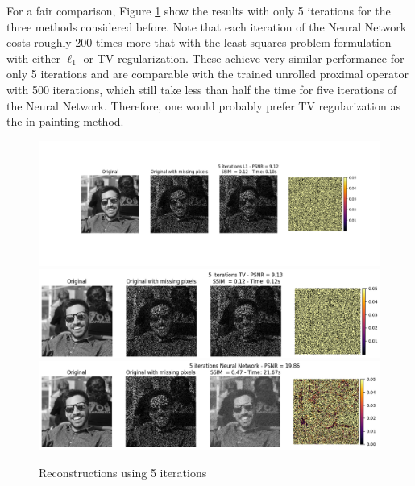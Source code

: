 \documentclass{article}
\begin{document}
\begin{enumerate}[label=2.\arabic*]
    For a fair comparison, Figure \ref{fig:5} show the results with only 5 iterations for the three methods considered before. Note that each iteration of the Neural Network costs roughly 200 times more that with the least squares problem formulation with either $\ell_1$ or TV regularization. These achieve very similar performance for only 5 iterations and are comparable with the trained unrolled proximal operator with 500 iterations, which still take less than half the time for five iterations of the Neural Network. Therefore, one would probably prefer TV regularization as the in-painting method.
    
    \begin{figure}[H]
        \centering
        \includegraphics[trim={4.5cm 3.5cm 2.5cm 0cm},clip,width=\textwidth]{img/l1_5.png}
        \includegraphics[trim={.5cm .25cm .25cm 0cm},clip,width=\textwidth]{img/tv_5.png}
        \includegraphics[trim={.5cm .25cm .25cm 0cm},clip,width=\textwidth]{img/nn_5.png}
        \caption{Reconstructions using 5 iterations}
        \label{fig:5}
    \end{figure}
\end{enumerate}
\end{document}
